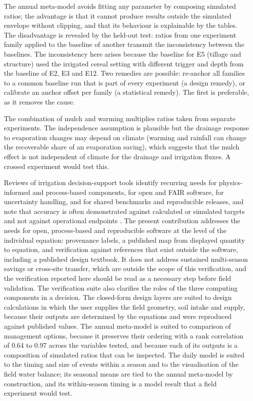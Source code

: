 The annual meta-model avoids fitting any parameter by composing simulated ratios; the advantage is that it cannot produce results outside the simulated envelope without clipping, and that its behaviour is explainable by the tables. The disadvantage is revealed by the held-out test: ratios from one experiment family applied to the baseline of another transmit the inconsistency between the baselines. The inconsistency here arises because the baseline for E5 (tillage and structure) used the irrigated cereal setting with different trigger and depth from the baseline of E2, E3 and E12. Two remedies are possible: re-anchor all families to a common baseline run that is part of every experiment (a design remedy), or calibrate an anchor offset per family (a statistical remedy). The first is preferable, as it removes the cause.

The combination of mulch and warming multiplies ratios taken from separate experiments. The independence assumption is plausible but the drainage response to evaporation changes may depend on climate (warming and rainfall can change the recoverable share of an evaporation saving), which suggests that the mulch effect is not independent of climate for the drainage and irrigation fluxes. A crossed experiment would test this.


Reviews of irrigation decision-support tools identify recurring needs for physics-informed and process-based components, for open and FAIR software, for uncertainty handling, and for shared benchmarks and reproducible releases, and note that accuracy is often demonstrated against calculated or simulated targets and not against operational endpoints \citep{Umutoni2024,Zhang2021ERL}. The present contribution addresses the needs for open, process-based and reproducible software at the level of the individual equation: provenance labels, a published map from displayed quantity to equation, and verification against references that exist outside the software, including a published design textbook. It does not address sustained multi-season savings or cross-site transfer, which are outside the scope of this verification, and the verification reported here should be read as a necessary step before field validation. The verification suite also clarifies the roles of the three computing components in a decision. The closed-form design layers are suited to design calculations in which the user supplies the field geometry, soil intake and supply, because their outputs are determined by the equations and were reproduced against published values. The annual meta-model is suited to comparison of management options, because it preserves their ordering with a rank correlation of 0.64 to 0.97 across the variables tested, and because each of its outputs is a composition of simulated ratios that can be inspected. The daily model is suited to the timing and size of events within a season and to the visualisation of the field water balance; its seasonal means are tied to the annual meta-model by construction, and its within-season timing is a model result that a field experiment would test.

